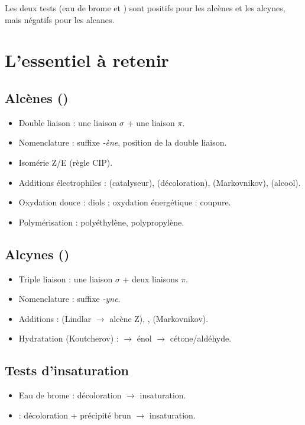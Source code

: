 \begin{aretenir}
Les deux tests (eau de brome et ) sont positifs pour les alcènes et les alcynes, mais négatifs pour les alcanes.
\end{aretenir}

\section{L'essentiel à retenir}

\begin{synthese}
\subsection*{Alcènes ()}
\begin{itemize}
    \item Double liaison  : une liaison $\sigma$ + une liaison $\pi$.
    \item Nomenclature : suffixe \textit{-ène}, position de la double liaison.
    \item Isomérie Z/E (règle CIP).
    \item Additions électrophiles :  (catalyseur),  (décoloration),  (Markovnikov),  (alcool).
    \item Oxydation douce : diols ; oxydation énergétique : coupure.
    \item Polymérisation : polyéthylène, polypropylène.
\end{itemize}

\subsection*{Alcynes ()}
\begin{itemize}
    \item Triple liaison  : une liaison $\sigma$ + deux liaisons $\pi$.
    \item Nomenclature : suffixe \textit{-yne}.
    \item Additions :  (Lindlar $\rightarrow$ alcène Z), ,  (Markovnikov).
    \item Hydratation (Koutcherov) : $\rightarrow$ énol $\rightarrow$ cétone/aldéhyde.
\end{itemize}

\subsection*{Tests d'insaturation}
\begin{itemize}
    \item Eau de brome : décoloration $\rightarrow$ insaturation.
    \item {} : décoloration + précipité brun $\rightarrow$ insaturation.
\end{itemize}


\end{synthese}
